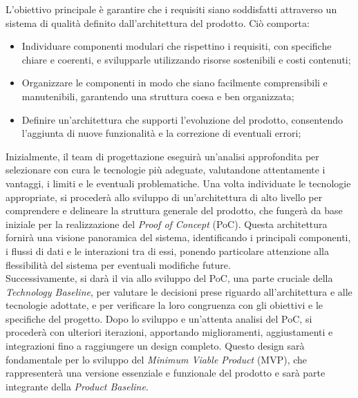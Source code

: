 L'obiettivo principale è garantire che i requisiti siano soddisfatti attraverso un sistema di qualità definito dall'architettura del prodotto. Ciò comporta:
\begin{itemize}
	\item Individuare componenti modulari che rispettino i requisiti, con specifiche chiare e coerenti, e svilupparle utilizzando risorse sostenibili e costi contenuti;
	\item Organizzare le componenti in modo che siano facilmente comprensibili e manutenibili, garantendo una struttura coesa e ben organizzata;
	\item Definire un'architettura che supporti l'evoluzione del prodotto, consentendo l'aggiunta di nuove funzionalità e la correzione di eventuali errori;
\end{itemize}
Inizialmente, il team di progettazione eseguirà un'analisi approfondita per selezionare con cura le tecnologie più adeguate, valutandone attentamente i vantaggi, i limiti e le eventuali problematiche. Una volta individuate le tecnologie appropriate, si procederà allo sviluppo di un'architettura di alto livello per comprendere e delineare la struttura generale del prodotto, che fungerà da base iniziale per la realizzazione del \textit{Proof of Concept} (PoC). Questa architettura fornirà una visione panoramica del sistema, identificando i principali componenti, i flussi di dati e le interazioni tra di essi, ponendo particolare attenzione alla flessibilità del sistema per eventuali modifiche future. \\Successivamente, si darà il via allo sviluppo del PoC, una parte cruciale della \textit{Technology Baseline}, per valutare le decisioni prese riguardo all'architettura e alle tecnologie adottate, e per verificare la loro congruenza con gli obiettivi e le specifiche del progetto. Dopo lo sviluppo e un'attenta analisi del PoC, si procederà con ulteriori iterazioni, apportando miglioramenti, aggiustamenti e integrazioni fino a raggiungere un design completo. Questo design sarà fondamentale per lo sviluppo del \textit{Minimum Viable Product} (MVP), che rappresenterà una versione essenziale e funzionale del prodotto e sarà parte integrante della \textit{Product Baseline}.

